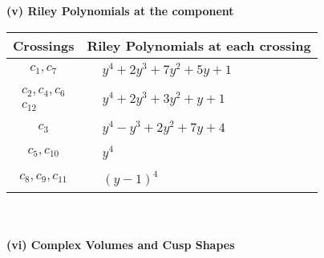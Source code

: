 \documentclass[1p]{elsarticle_modified}
\theoremstyle{definition}
\begin{document}
\newpage\renewcommand{\arraystretch}{1}
\flushleft \textbf{(v) Riley Polynomials at the component}\newline \\
\begin{tabular}{m{50pt}|m{274pt}}
Crossings & \hspace{64pt}Riley Polynomials at each crossing \\
\hline $$\begin{aligned}c_{1},c_{7}\end{aligned}$$&$\begin{aligned}
&y^4+2 y^3+7 y^2+5 y+1
\end{aligned}$\\
\hline $$\begin{aligned}c_{2},c_{4},c_{6}\\c_{12}\end{aligned}$$&$\begin{aligned}
&y^4+2 y^3+3 y^2+y+1
\end{aligned}$\\
\hline $$\begin{aligned}c_{3}\end{aligned}$$&$\begin{aligned}
&y^4- y^3+2 y^2+7 y+4
\end{aligned}$\\
\hline $$\begin{aligned}c_{5},c_{10}\end{aligned}$$&$\begin{aligned}
&y^4
\end{aligned}$\\
\hline $$\begin{aligned}c_{8},c_{9},c_{11}\end{aligned}$$&$\begin{aligned}
&(y-1)^4
\end{aligned}$\\
\hline
\end{tabular}\\~\\
\newpage\flushleft \textbf{(vi) Complex Volumes and Cusp Shapes}
\end{document}
